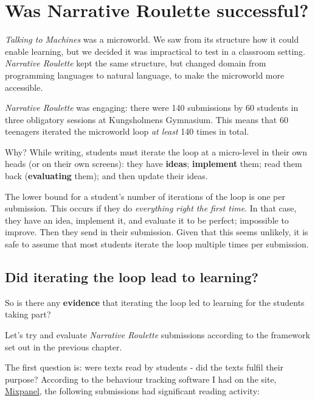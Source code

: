 \section{Was Narrative Roulette successful?}

\emph{Talking to Machines} was a microworld. We saw from its structure
how it could enable learning, but we decided it was impractical to test
in a classroom setting. \emph{Narrative Roulette} kept the same
structure, but changed domain from programming languages to natural
language, to make the microworld more accessible.

\emph{Narrative Roulette} was engaging: there were
140 submissions by 60 students in three obligatory sessions at Kungsholmens Gymnasium. This means that 60 teenagers iterated the microworld
loop \emph{at least} 140 times in total.

Why? While writing, students must iterate the loop at a micro-level in
their own heads (or on their own screens): they have \textbf{ideas}; \textbf{implement}
them; read them back (\textbf{evaluating} them); and then update their ideas. 

The lower bound for a student's number of iterations of the loop is one per submission. This occurs if they do \emph{everything right the first time}. In that case,
they have an idea, implement it, and evaluate it to be perfect;
impossible to improve. Then they send in their submission. Given that this seems unlikely, it is safe to assume that most students iterate the loop multiple times
per submission.

\subsection{Did iterating the loop lead to learning?}

So is there any \textbf{evidence} that iterating the loop led to learning for the students taking part? 

Let's try and evaluate \emph{Narrative Roulette} submissions according to the framework set out in the previous chapter. 

The first question is: were texts read by students - did the texts fulfil their purpose? According to the behaviour tracking software I had on the site, \href{http://mixpanel.com}{Mixpanel}, the following submissions had significant reading activity:

